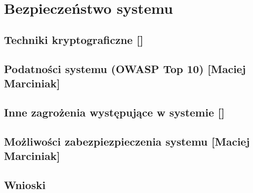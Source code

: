 \newpage\section{Bezpieczeństwo systemu \textsl{\NazwaSys}} \label{sec:bezpieczenstwo}
\subsection[Techniki kryptograficzne]{Techniki kryptograficzne [\StudentB]}

\newpage
\subsection[Podatności systemu (OWASP Top 10)]{Podatności systemu (OWASP Top 10) [Maciej Marciniak]}

\newpage
\subsection[Inne zagrożenia występujące w systemie]{Inne zagrożenia występujące w systemie [\StudentB]}

\newpage
\subsection[Możliwości zabezpiezpieczenia systemu]{Możliwości zabezpiezpieczenia systemu [Maciej Marciniak]}

\newpage
\subsection{Wnioski}
 
